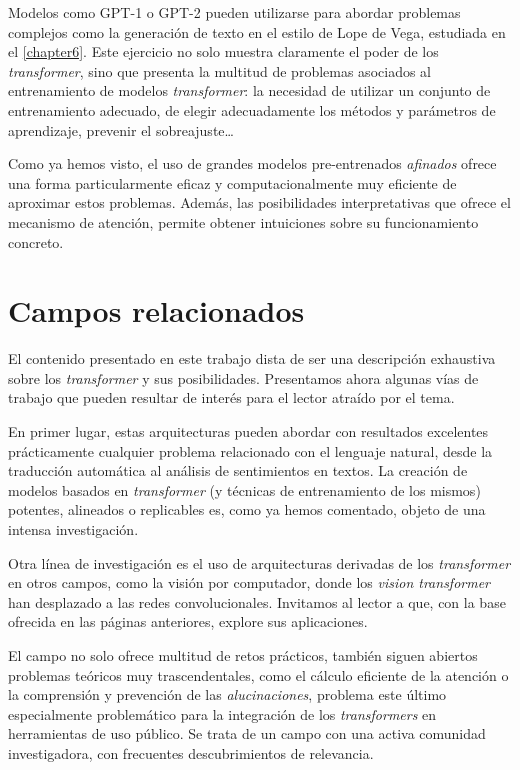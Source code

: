Modelos como GPT-1 o GPT-2 pueden utilizarse para abordar problemas complejos como la generación de texto en el estilo de Lope de Vega, estudiada en el \cref{chapter6}. Este ejercicio no solo muestra claramente el poder de los \textit{transformer}, sino que presenta la multitud de problemas asociados al entrenamiento de modelos \textit{transformer}: la necesidad de utilizar un conjunto de entrenamiento adecuado, de elegir adecuadamente los métodos y parámetros de aprendizaje, prevenir el sobreajuste…

Como ya hemos visto, el uso de grandes modelos pre-entrenados \textit{afinados} ofrece una forma particularmente eficaz y computacionalmente muy eficiente de aproximar estos problemas. Además, las posibilidades interpretativas que ofrece el mecanismo de atención, permite obtener intuiciones sobre su funcionamiento concreto.

\section{Campos relacionados}
El contenido presentado en este trabajo dista de ser una descripción exhaustiva sobre los \textit{transformer} y sus posibilidades. Presentamos ahora algunas vías de trabajo que pueden resultar de interés para el lector atraído por el tema.

En primer lugar, estas arquitecturas pueden abordar con resultados excelentes prácticamente cualquier problema relacionado con el lenguaje natural, desde la traducción automática al análisis de sentimientos en textos. La creación de modelos basados en \textit{transformer} (y técnicas de entrenamiento de los mismos) potentes, alineados o replicables es, como ya hemos comentado, objeto de una intensa investigación.

Otra línea de investigación es el uso de arquitecturas derivadas de los \textit{transformer} en otros campos, como la visión por computador, donde los \textit{vision transformer} han desplazado a las redes convolucionales. Invitamos al lector a que, con la base ofrecida en las páginas anteriores, explore sus aplicaciones.

El campo no solo ofrece multitud de retos prácticos, también siguen abiertos problemas teóricos muy trascendentales, como el cálculo eficiente de la atención o la comprensión y prevención de las \textit{alucinaciones}, problema este último especialmente problemático para la integración de los \textit{transformers} en herramientas de uso público. Se trata de un campo con una activa comunidad investigadora, con frecuentes descubrimientos de relevancia.

